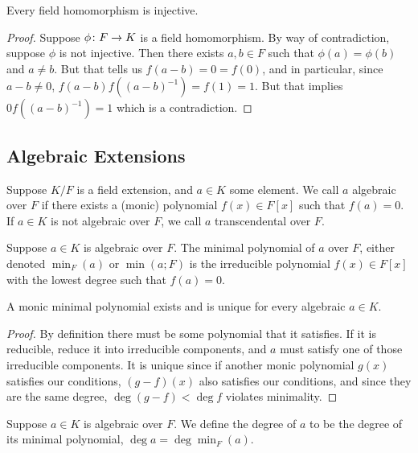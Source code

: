 \begin{theorem}\label{thm:field-hom-injective}
    Every field homomorphism is injective.
\end{theorem}
\begin{proof}
    Suppose \(\phi\colon F\to K\) is a field homomorphism.
    By way of contradiction, suppose \(\phi\) is not injective.
    Then there exists \(a,b \in F\) such that \(\phi(a) = \phi(b)\) and \(a \neq b\).
    But that tells us \(f(a-b) = 0 = f(0)\), and in particular,
    since \(a-b \neq 0\), \(f(a-b)f({(a-b)}^{-1}) = f(1) = 1\).
    But that implies \(0f({(a-b)}^{-1}) = 1\) which is a contradiction.
\end{proof}


\subsection{Algebraic Extensions}

\begin{definition}
    Suppose \(K/F\) is a field extension, and \(a \in K\) some element.
    We call \(a\) algebraic over \(F\)
    if there exists a (monic) polynomial \(f(x) \in F[x]\) such that \(f(a) = 0\).
    If \(a \in K\) is not algebraic over \(F\),
    we call \(a\) transcendental over \(F\).
\end{definition}

\begin{definition}
    Suppose \(a \in K\) is algebraic over \(F\).
    The minimal polynomial of \(a\) over \(F\),
    either denoted \(\min_F(a)\) or \(\min(a;F)\)
    is the irreducible polynomial \(f(x) \in F[x]\)
    with the lowest degree such that \(f(a) = 0\).
\end{definition}
\begin{proposition}
    A monic minimal polynomial exists and is unique for every algebraic \(a \in K\).
\end{proposition}
\begin{proof}
    By definition there must be some polynomial that it satisfies.
    If it is reducible, reduce it into irreducible components,
    and \(a\) must satisfy one of those irreducible components.
    It is unique since if another monic polynomial \(g(x)\) satisfies our conditions,
    \((g-f)(x)\) also satisfies our conditions,
    and since they are the same degree, \(\deg(g-f) < \deg f\) violates minimality.
\end{proof}
\begin{definition}
    Suppose \(a \in K\) is algebraic over \(F\).
    We define the degree of \(a\) to be the degree of its minimal polynomial,
    \(\deg a = \deg \min_F(a)\).
\end{definition}

